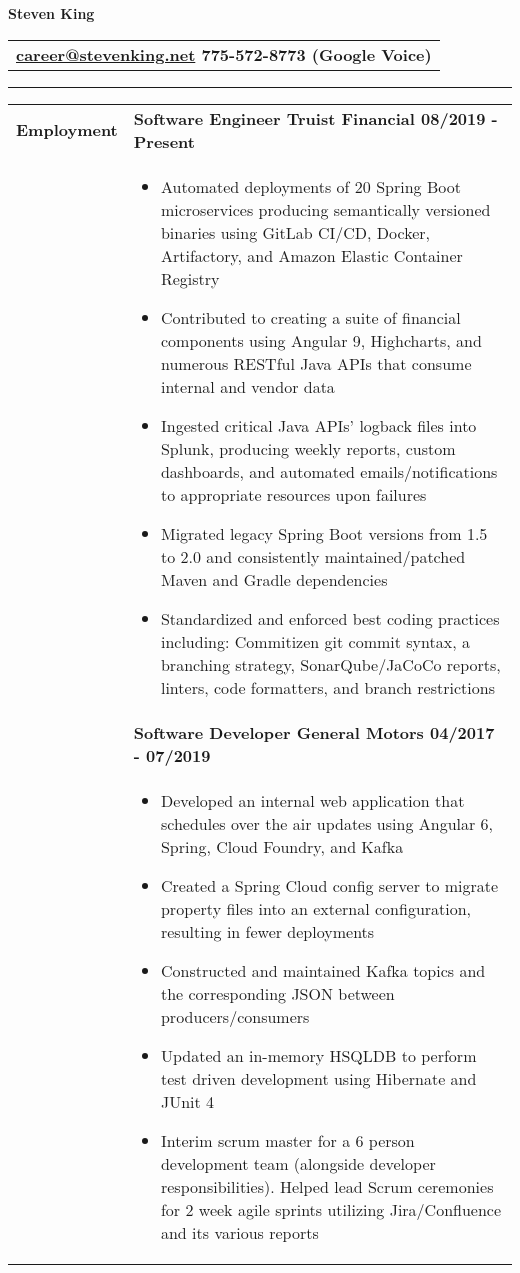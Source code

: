 \documentclass[final]{letter}
\begin{document}
\begin{center}
	{\fontsize{36}{43.2}\selectfont\bf{Steven King}} \hspace{.18cm} {
		\begin{tabular}{c}\large\bf{\href{mailto:career@stevenking.net}{career@stevenking.net} \hspace{.2cm} 775-572-8773 (Google Voice)} \end{tabular}}
		
	\rule{.99\textwidth}{1pt}	

	\begin{tabularx}{\linewidth}{>{\raggedright\bf\Large{}}p{10.75em}X} Employment 
		& \large\bf{Software Engineer \hfill {Truist Financial} \hfill 08/2019 - Present} \\
			& \begin{itemize}[noitemsep,topsep=0pt]\setlength\itemsep{2px}
				\item Automated deployments of 20 Spring Boot microservices producing semantically versioned binaries using GitLab CI/CD, Docker, Artifactory, and Amazon Elastic Container Registry
				\item Contributed to creating a suite of financial components using Angular 9, Highcharts, and numerous RESTful Java APIs that consume internal and vendor data
				\item Ingested critical Java APIs' logback files into Splunk, producing weekly reports, custom dashboards, and automated emails/notifications to appropriate resources upon failures
				\item Migrated legacy Spring Boot versions from 1.5 to 2.0 and consistently maintained/patched Maven and Gradle dependencies
				\item Standardized and enforced best coding practices including: Commitizen git commit syntax, a branching strategy, SonarQube/JaCoCo reports, linters, code formatters, and branch restrictions
			\end{itemize} \\
	
		& \large\bf{Software Developer \hfill {General Motors} \hfill 04/2017 - 07/2019} \\
			& \begin{itemize}[noitemsep,topsep=0pt]\setlength\itemsep{2px}
				\item Developed an internal web application that schedules over the air updates using Angular 6, Spring, Cloud Foundry, and Kafka
				\item Created a Spring Cloud config server to migrate property files into an external configuration, resulting in fewer deployments
				\item Constructed and maintained Kafka topics and the corresponding JSON between producers/consumers
				\item Updated an in-memory HSQLDB to perform test driven development using Hibernate and JUnit 4
				\item Interim scrum master for a 6 person development team (alongside developer responsibilities). Helped lead Scrum ceremonies for 2 week agile sprints utilizing Jira/Confluence and its various reports
			\end{itemize} \\


\end{tabularx}
\end{center}
\end{document}
